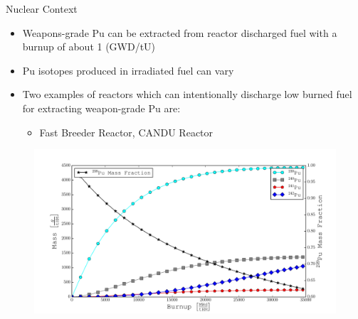 \documentclass{beamer}
\begin{document}
\begin{frame}{Nuclear Context}
  \begin{itemize}
  \item{Weapons-grade Pu can be extracted from reactor discharged fuel
    with a burnup of about 1 (GWD/tU)}
  \item{Pu isotopes produced in irradiated fuel can vary} %
  \item{Two examples of reactors which can intentionally
  discharge low burned fuel for extracting weapon-grade Pu are:}
  \begin{itemize}
  \item{Fast Breeder Reactor, CANDU Reactor}
  \end{itemize}
  \end{itemize}
  \begin{figure}[H]
    \vspace{-3mm}
      \begin{center}
        \includegraphics[scale = 0.26]{figures/BurnPuComp_grams}
      \end{center}
    \end{figure}
\end{frame}
\end{document}
